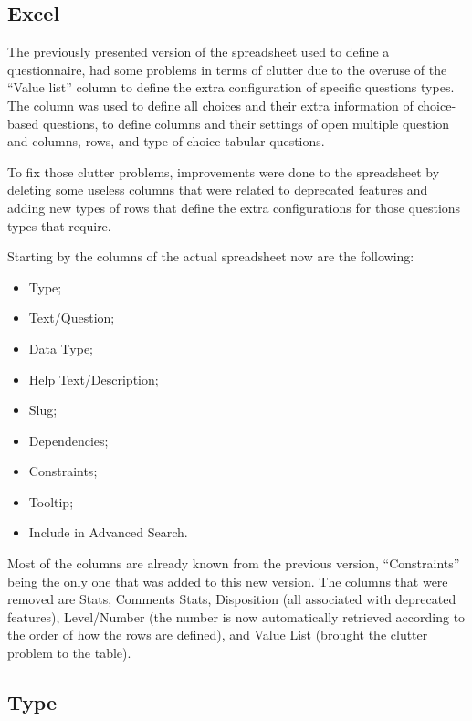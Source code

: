 \subsection{Excel}

The previously presented version of the spreadsheet used to define a questionnaire, had some problems in terms of clutter due to the overuse of the ``Value list'' column to define the extra configuration of specific questions types.
The column was used to define all choices and their extra information of choice-based questions, to define columns and their settings of open multiple question and columns, rows, and type of choice tabular questions.

To fix those clutter problems, improvements were done to the spreadsheet by deleting some useless columns that were related to deprecated features and adding new types of rows that define the extra configurations for those questions types that require.

Starting by the columns of the actual spreadsheet now are the following:

\begin{itemize}
    \item Type;
    \item Text/Question;
    \item Data Type;
    \item Help Text/Description;
    \item Slug;
    \item Dependencies;
    \item Constraints;
    \item Tooltip;
    \item Include in Advanced Search.
\end{itemize}

Most of the columns are already known from the previous version, ``Constraints'' being the only one that was added to this new version.
The columns that were removed are Stats, Comments Stats, Disposition (all associated with deprecated features), Level/Number (the number is now automatically retrieved according to the order of how the rows are defined), and Value List (brought the clutter problem to the table).

\subsection*{Type}

